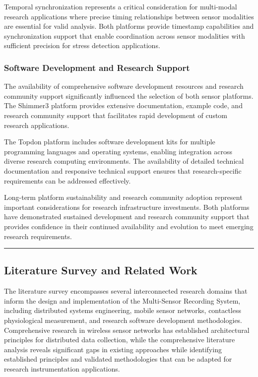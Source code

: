 \documentclass[11pt,a4paper]{article}
\begin{document}
Temporal synchronization represents a critical consideration for multi-modal research applications where precise timing
relationships between sensor modalities are essential for valid analysis. Both platforms provide timestamp capabilities
and synchronization support that enable coordination across sensor modalities with sufficient precision for stress
detection applications.

\subsubsection{Software Development and Research Support}

The availability of comprehensive software development resources and research community support significantly influenced
the selection of both sensor platforms. The Shimmer3 platform provides extensive documentation, example code, and
research community support that facilitates rapid development of custom research applications.

The Topdon platform includes software development kits for multiple programming languages and operating systems,
enabling integration across diverse research computing environments. The availability of detailed technical
documentation and responsive technical support ensures that research-specific requirements can be addressed effectively.

Long-term platform sustainability and research community adoption represent important considerations for research
infrastructure investments. Both platforms have demonstrated sustained development and research community support that
provides confidence in their continued availability and evolution to meet emerging research requirements.

\hrule

\subsection{Literature Survey and Related Work}

The literature survey encompasses several interconnected research domains that inform the design and implementation of
the Multi-Sensor Recording System, including distributed systems engineering, mobile sensor networks, contactless
physiological measurement, and research software development methodologies. Comprehensive research in wireless sensor
networks has established architectural principles for distributed data collection, while the comprehensive literature
analysis reveals significant gaps in existing approaches while identifying established principles and validated
methodologies that can be adapted for research instrumentation applications.
\end{document}
